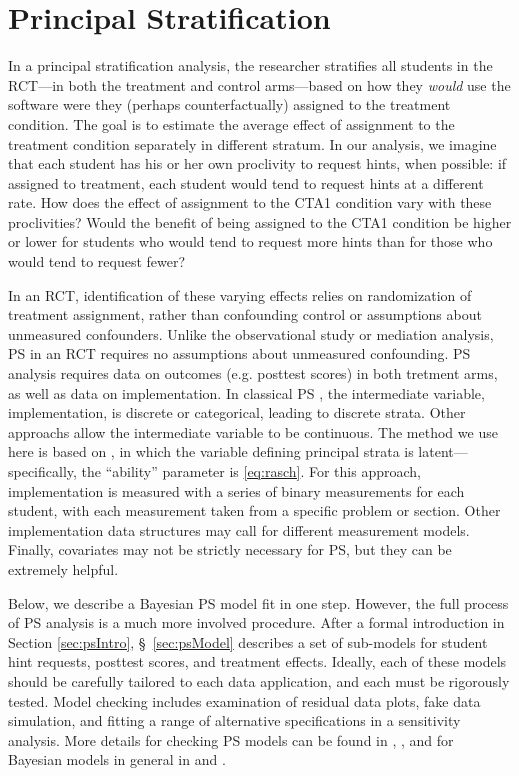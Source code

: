 \documentclass{article}\usepackage[]{graphicx}\usepackage[]{color}
\begin{document}
\section{Principal Stratification}\label{sec:principalStratification}

In a principal stratification \citep[PS;][]{frangakis}  analysis, the researcher stratifies all students in
the RCT---in both the treatment and control arms---based on how they
\emph{would} use the software were they (perhaps counterfactually) assigned
to the treatment condition.
The goal is to estimate the average effect of
assignment to the treatment condition separately in different stratum.
In our analysis, we imagine that each student has his or her own proclivity to request hints, when possible: if assigned to treatment, each student would tend to request hints at a different rate.
How does the effect of assignment to the CTA1 condition vary with these proclivities?
Would the benefit of being assigned to the CTA1 condition be higher or lower for students who would tend to request more hints than for those who would tend to request fewer?

In an RCT, identification of these varying effects relies on
randomization of treatment assignment,
rather than confounding control or assumptions about
unmeasured confounders.
Unlike the observational study or mediation analysis, PS in an RCT requires no assumptions about unmeasured confounding.
PS analysis requires data on outcomes
(e.g. posttest scores) in both tretment arms, as well as data on
implementation.
In classical PS
\citep[e.g.][]{page2012principal,feller2016compared}, the intermediate
variable, implementation, is discrete or categorical, leading to
discrete strata.
Other approachs \citep[e.g.]{gilbertHudgens,jin2008principal} allow
the intermediate variable to be continuous.
The method we use here is based on \citet{aoas}, in which the variable
defining principal strata is latent---specifically, the ``ability''
parameter is \eqref{eq:rasch}.
For this approach, implementation is measured with a series of binary
measurements for each student, with each measurement taken from a
specific problem or section.
Other implementation data structures may call for different
measurement models.
Finally, covariates may not be strictly necessary for PS, but they can be extremely helpful.

Below, we describe a Bayesian PS model fit in one step.
However, the full process of PS analysis is a much more involved
procedure.
After a formal introduction in Section \ref{sec:psIntro},
\S~\ref{sec:psModel} describes a set of sub-models for student hint
requests, posttest scores, and treatment effects.
Ideally, each of these models should be carefully tailored to each
data application, and each must be rigorously tested.
Model checking includes examination of residual data plots, fake data
simulation, and fitting a range of alternative specifications in a
sensitivity analysis.
More details for checking PS models can be found in \citet{aoas},
\citet{psTutorial}, and for Bayesian models in general in
\citet{gelman2014bayesian} and \citet{mcelreath2020statistical}.
\end{document}
